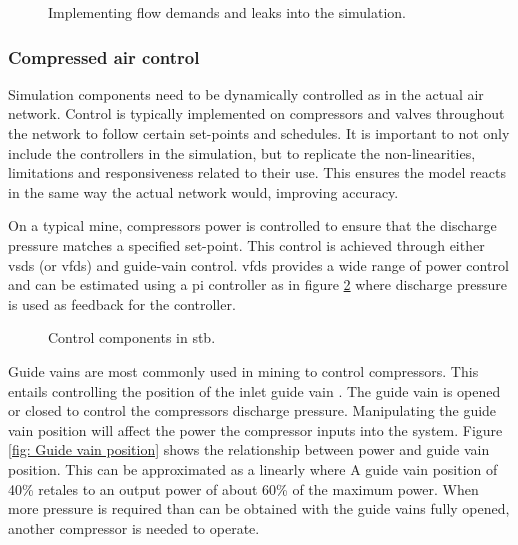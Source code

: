 			\begin{figure}[h]
				\centering
				\caption{Implementing flow demands and leaks into the simulation.} 
				\label{fig: Demand component}
			\end{figure}
		\subsubsection{Compressed air control}\label{Controllers}
			Simulation components need to be dynamically controlled as in the actual air network. Control is typically implemented on compressors and valves throughout the network to follow certain set-points and schedules. It is important to not only include the controllers in the simulation, but to replicate the non-linearities, limitations and responsiveness related to their use. This ensures the model reacts in the same way the actual network would, improving accuracy.
			\par 
			On a typical mine, compressors power is controlled to ensure that the discharge pressure matches a specified set-point. This control is achieved through either \glspl{vsd} (or \glspl{vfd}) and guide-vain control. \glspl{vfd} provides a wide range of power control and can be estimated using a \gls{pi} controller as in figure \ref{fig: Controller models} where discharge pressure is used as feedback for the controller. 
	\begin{figure}[h]
		\centering
		\caption{Control components in \gls{stb}.}
		\label{fig: Controller models}
	\end{figure}
		Guide vains are most commonly used in mining to control compressors. This entails controlling the position of the inlet guide vain . The guide vain is opened or closed to control the compressors discharge pressure.  Manipulating the guide vain position will affect the power the compressor inputs into the system. Figure \ref{fig: Guide vain position} shows the relationship between  power and guide vain position. This can be approximated as a linearly where A guide vain position of 40\%  retales to an output power of about 60\% of the maximum power. When more pressure is required than can be obtained with the guide vains fully opened, another compressor is needed to operate. 
